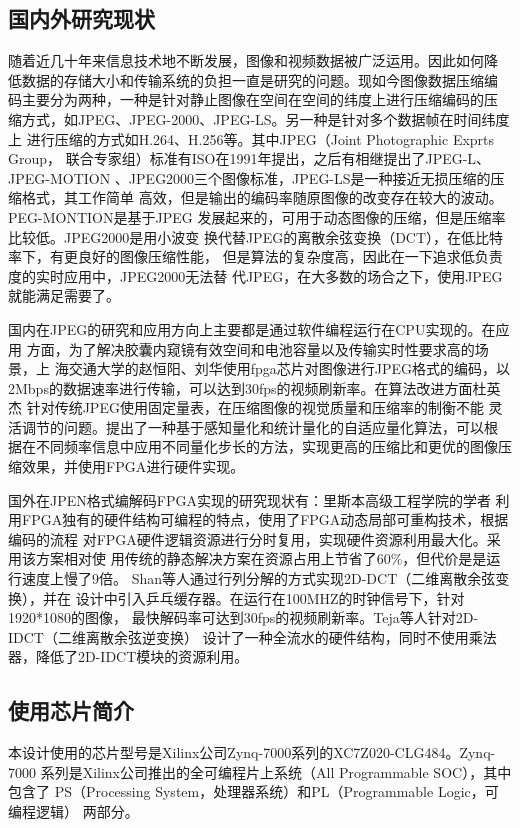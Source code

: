\documentclass{article}
\numberwithin {equation}{section}
\begin{document}
\begin{spacing}{1.25}
  \subsection{国内外研究现状}
    \vspace{1em}
    随着近几十年来信息技术地不断发展，图像和视频数据被广泛运用。因此如何降
    低数据的存储大小和传输系统的负担一直是研究的问题。现如今图像数据压缩编
    码主要分为两种，一种是针对静止图像在空间在空间的纬度上进行压缩编码的压
    缩方式，如JPEG、JPEG-2000、JPEG-LS。另一种是针对多个数据帧在时间纬度上
    进行压缩的方式如H.264、H.256等。其中JPEG（Joint Photographic Exprts Group，
    联合专家组）标准有ISO在1991年提出，之后有相继提出了JPEG-L、JPEG-MOTION
    、JPEG2000三个图像标准，JPEG-LS是一种接近无损压缩的压缩格式，其工作简单
    高效，但是输出的编码率随原图像的改变存在较大的波动。PEG-MONTION是基于JPEG
    发展起来的，可用于动态图像的压缩，但是压缩率比较低。JPEG2000是用小波变
    换代替JPEG的离散余弦变换（DCT），在低比特率下，有更良好的图像压缩性能，
    但是算法的复杂度高，因此在一下追求低负责度的实时应用中，JPEG2000无法替
    代JPEG，在大多数的场合之下，使用JPEG就能满足需要了。

    国内在JPEG的研究和应用方向上主要都是通过软件编程运行在CPU实现的。在应用
    方面，为了解决胶囊内窥镜有效空间和电池容量以及传输实时性要求高的场景，上
    海交通大学的赵恒阳、刘华\cite{ref1}使用fpga芯片对图像进行JPEG格式的编码，以
    2Mbps的数据速率进行传输，可以达到30fps的视频刷新率。在算法改进方面杜英杰
    \cite{ref2}针对传统JPEG使用固定量表，在压缩图像的视觉质量和压缩率的制衡不能
    灵活调节的问题。提出了一种基于感知量化和统计量化的自适应量化算法，可以根
    据在不同频率信息中应用不同量化步长的方法，实现更高的压缩比和更优的图像压
    缩效果，并使用FPGA进行硬件实现。

    国外在JPEN格式编解码FPGA实现的研究现状有：里斯本高级工程学院的学者
    \cite{ref10}利用FPGA独有的硬件结构可编程的特点，使用了FPGA动态局部可重构技术，根据编码的流程
    对FPGA硬件逻辑资源进行分时复用，实现硬件资源利用最大化。采用该方案相对使
    用传统的静态解决方案在资源占用上节省了60\%，但代价是是运行速度上慢了9倍。
    Shan等人\cite{ref11}通过行列分解的方式实现2D-DCT（二维离散余弦变换），并在
    设计中引入乒乓缓存器。在运行在100MHZ的时钟信号下，针对1920*1080的图像，
    最快解码率可达到30fps的视频刷新率。Teja等人针对2D-IDCT（二维离散余弦逆变换）
    设计了一种全流水的硬件结构，同时不使用乘法器，降低了2D-IDCT模块的资源利用。
  \subsection{使用芯片简介}
    \vspace{1em}
    本设计使用的芯片型号是Xilinx公司Zynq-7000系列的XC7Z020-CLG484。Zynq-7000
    系列是Xilinx公司推出的全可编程片上系统（All Programmable SOC），其中包含了
    PS（Processing System，处理器系统）和PL（Programmable Logic，可编程逻辑）
    两部分。


\end{spacing}
\end{document}
